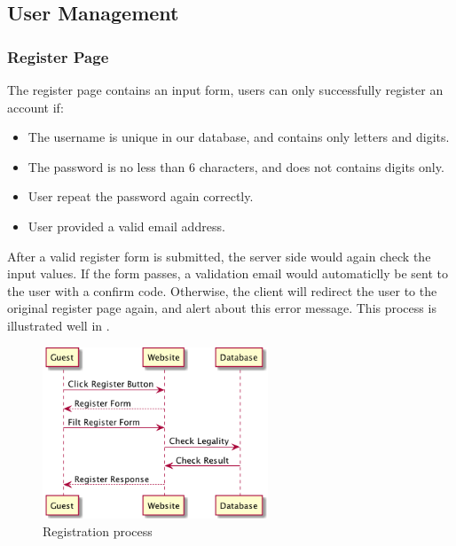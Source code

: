 
\subsection{User Management}

\subsubsection{Register Page}

The register page contains an input form, users can only successfully
register an account if:

\begin{itemize}
\itemsep1pt\parskip0pt
\item
  The username is unique in our database, and contains only letters and
  digits.
\item
  The password is no less than 6 characters, and does not contains
  digits only.
\item
  User repeat the password again correctly.
\item
  User provided a valid email address.
\end{itemize}

After a valid register form is submitted, the server side would again
check the input values. If the form passes, a validation email would
automaticlly be sent to the user with a confirm code. Otherwise, the
client will redirect the user to the original register page again, and
alert about this error message. This process is illustrated well in .

\begin{figure}[H]
  \centering
  \includegraphics[width=0.6\textwidth]{img/register.png}
  \caption{Registration process\label{fig:register}}
\end{figure}


